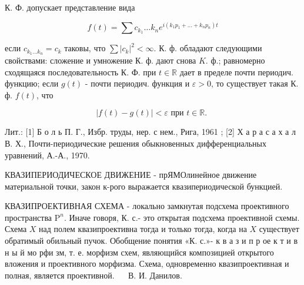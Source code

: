 \documentclass[10pt]{article}
\begin{document}
К. Ф. допускает представление вида



\[

f(t)=\sum c_{k_{1}} \ldots k_{n} e^{i\left(k_{1} p_{1}+\ldots+k_{n} p_{n}\right) t}

\]



если $c_{k_{1} \ldots k_{n}}=c_{k}$ таковы, что $\sum\left|c_{k}\right|^{2}<\infty$. К. ф. обладают следующими свойствами: сложение и умножение К. ф. дают снова $K$. ф.; равномерно сходящаяся последовательность К. Ф. при $t \in \mathbb{R}$ дает в пределе почти периодич. функцию; если $g(t)$ - почти периодич. функция и $\varepsilon>0$, то существует такая К. ф. $f(t)$, что



\[

|f(t)-g(t)|<\varepsilon \text { при } t \in \mathbb{R} \text {. }

\]



Лит.: [1] Б о л ь П. Г., Избр. труды, нер. с нем., Рига, 1961 ; [2] Х а р а с а х а л В. Х., Почти-периодические решения обыкновенных дифференциальных уравнений, А.-А., 1970.



КВАЗИПЕРИОДИЧЕСКОЕ ДВИЖЕНИЕ - прЯМОлинейное движение материальной точки, закон к-рого выражается квазипериодической бункцией.



КВАЗИПРОЕКТИВНАЯ СХЕМА - локально замкнутая подсхема проективного пространства $\mathrm{P}^{n}$. Иначе говоря, К. с.- это открытая подсхема проективной схемы. Схема $X$ над полем квазипроективна тогда и только тогда, когда на $X$ существует обратимый обильный пучок. Обобщение понятия «К. с.»- к в а з и п р ое к т и в н ы й мо рфи зм, т. е. морфизм схем, являющийся композицией открытого вложения и проективного морфизма. Схема, одновременно квазипроективная и полная, является проективной. $\quad$ В. И. Данилов.
\end{document}
